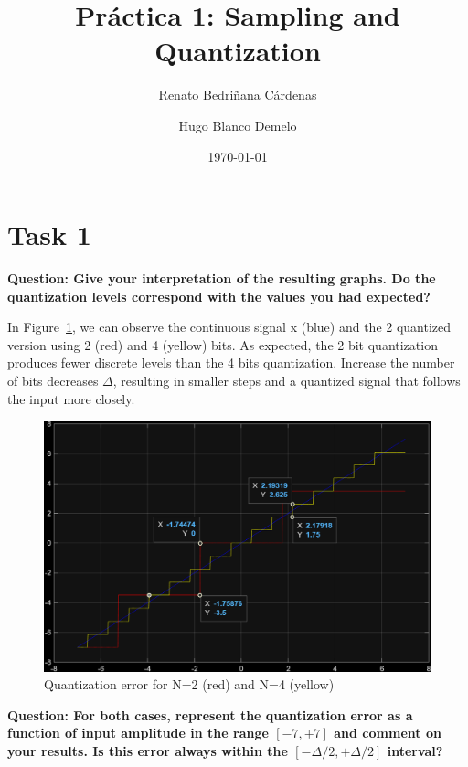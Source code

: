 \documentclass[11pt,a4paper]{article}
\title{\vspace{-1.5cm}\Large\textbf{Práctica 1: Sampling and Quantization}}
\author{\normalsize Renato Bedriñana Cárdenas \and \normalsize Hugo Blanco Demelo}
\date{\normalsize\today}
\begin{document}
\maketitle
\section{Task 1}
\textbf{Question: Give your interpretation of the resulting graphs. Do the quantization levels correspond with the values you had expected?}

\vspace{0.5cm}

In Figure~\ref{fig:task1_2}, we can observe the continuous signal x (blue) and the 2 quantized version using 2 (red) and 4 (yellow) bits.
As expected, the 2 bit quantization produces fewer discrete levels than the 4 bits quantization.
Increase the number of bits decreases $\Delta$, resulting in smaller steps and a quantized signal that follows the input more closely.

\begin{figure}[H]  %
    \centering
    \includegraphics[width=1\textwidth]{img/task1_2.png}
    \caption{Quantization error for N=2 (red) and N=4 (yellow)}
    \label{fig:task1_2}
\end{figure}

\vspace{1cm}
\textbf{Question: For both cases, represent the quantization error as a function of input amplitude in the range $[-7, +7]$ and comment on your results. Is this error always within the $[-\Delta /2, +\Delta /2]$ interval?}
\end{document}
